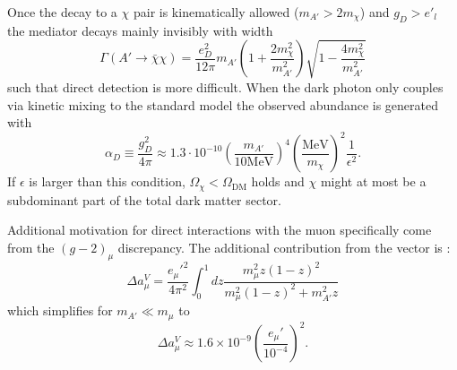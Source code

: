 Once the decay to a $\chi$ pair is kinematically allowed ($m_{A'}>2m_\chi$) and $g_D > e'_l$ the mediator decays mainly invisibly with width 
\begin{equation}
\Gamma(A' \rightarrow \bar{\chi}\chi)=\frac{e_D^{2}}{12\pi}m_{A'}\left(1+\frac{2m_\chi^2}{m_{A'}^2}\right)\sqrt{1-\frac{4m_\chi^2}{m_{A'}^2}}
\end{equation}
such that direct detection is more difficult.  
When the dark photon only couples via kinetic mixing to the standard model the observed abundance is generated with \cite{Izaguirre:2014bca}
\begin{equation}
\alpha_D \equiv \frac{g_D^2}{4\pi} \approx 1.3\cdot 10^{-10}\left(\frac{m_{A'}}{10\text{MeV}}\right)^4\left(\frac{\text{MeV}}{m_\chi}\right)^2\frac{1}{\epsilon^2}.
\end{equation}
If $\epsilon$ is larger than this condition, $\Omega_\chi < \Omega_{\text{DM}}$ holds and $\chi$ might at most be a subdominant part of the total dark matter sector. 

Additional motivation for direct interactions with the muon specifically come from the $(g-2)_\mu$ discrepancy. The additional contribution from the vector is \cite{Kahn:2018cqs}:
\begin{equation}
\Delta a_\mu^V=\frac{e_\mu'^2}{4\pi^2}\int_0^1 d z \frac{m_\mu^2z(1-z)^2}{m_\mu^2(1-z)^2+m_{A'}^2z}
\end{equation}
which simplifies for $m_{A'}\ll m_\mu$ to
\begin{equation}
\Delta a_\mu^V \approx 1.6\times 10^{-9}\left(\frac{e_\mu'}{10^{-4}}\right)^2.
\end{equation}

